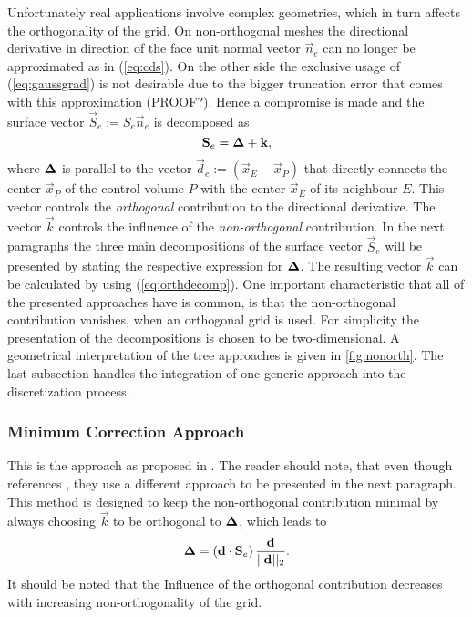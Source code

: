 Unfortunately real applications involve complex geometries, which in turn affects the orthogonality of the grid. On non-orthogonal meshes the directional derivative in direction of the face unit normal vector \(\vec{n}_e\) can no longer be approximated as in (\ref{eq:cds}). On the other side the exclusive usage of (\ref{eq:gaussgrad}) is not desirable due to the bigger truncation error that comes with this approximation (PROOF?). Hence a compromise is made and the surface vector \(\vec{S}_e := S_e \vec{n}_e\) is decomposed as
\begin{equation}
  \label{eq:orthdecomp}
  \mathbf{S}_e = \boldsymbol{\Delta} + \mathbf{k},
\end{equation}
where \(\boldsymbol{\Delta}\) is parallel to the vector \(\vec{d}_e := \left(\vec{x}_E - \vec{x}_P\right)\) that directly connects the center \(\vec{x}_P\) of the control volume \(P\) with the center \(\vec{x}_E\) of its neighbour \(E\). This vector controls the \emph{orthogonal} contribution to the directional derivative. The vector \(\vec{k}\) controls the influence of the \emph{non-orthogonal} contribution. In the next paragraphs the three main decompositions of the surface vector \(\vec{S}_e\) will be presented by stating the respective expression for \(\boldsymbol{\Delta}\). The resulting vector \(\vec{k}\) can be calculated by using (\ref{eq:orthdecomp}). One important characteristic that all of the presented approaches have is common, is that the non-orthogonal contribution vanishes, when an orthogonal grid is used. For simplicity the presentation of the decompositions is chosen to be two-dimensional. A geometrical interpretation of the tree approaches is given in \ref{fig:nonorth}. The last subsection handles the integration of one generic approach into the discretization process.

\subsubsection{Minimum Correction Approach}

This is the approach as proposed in \cite{muzaferja}. The reader should note, that even though \cite{ferziger02} references \cite{muzaferja}, they use a different approach to be presented in the next paragraph. This method is designed to keep the non-orthogonal contribution minimal by always choosing \(\vec{k}\) to be orthogonal to \(\boldsymbol{\Delta}\), which leads to
\begin{displaymath}
  \boldsymbol{\Delta} = \left( \mathbf{d} \cdot \mathbf{S}_e \right) \frac{\mathbf{d}}{||\mathbf{d}||_2}.
\end{displaymath}
It should be noted that the Influence of the orthogonal contribution decreases with increasing non-orthogonality of the grid.

